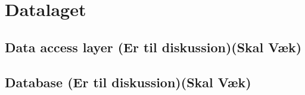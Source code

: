 \chapter{Datalaget}

\section{Data access layer (Er til diskussion)(Skal Væk)}

\section{Database (Er til diskussion)(Skal Væk)}



